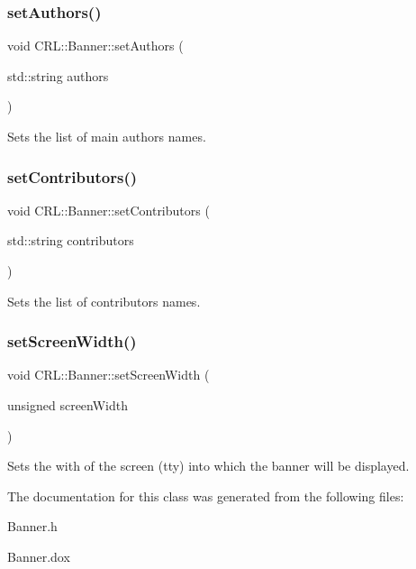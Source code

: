 \subsubsection{\texorpdfstring{set\+Authors()}{setAuthors()}}
{\footnotesize\ttfamily void C\+R\+L\+::\+Banner\+::set\+Authors (\begin{DoxyParamCaption}\item[{std\+::string}]{authors }\end{DoxyParamCaption})}

Sets the list of main author\textquotesingle{}s names. \mbox{\label{classCRL_1_1Banner_afa9171420263314ee5b465c36ecc0b73}} 
\subsubsection{\texorpdfstring{set\+Contributors()}{setContributors()}}
{\footnotesize\ttfamily void C\+R\+L\+::\+Banner\+::set\+Contributors (\begin{DoxyParamCaption}\item[{std\+::string}]{contributors }\end{DoxyParamCaption})}

Sets the list of contributor\textquotesingle{}s names. \mbox{\label{classCRL_1_1Banner_a8053cc6071f261e781cc1e8157eef820}} 
\subsubsection{\texorpdfstring{set\+Screen\+Width()}{setScreenWidth()}}
{\footnotesize\ttfamily void C\+R\+L\+::\+Banner\+::set\+Screen\+Width (\begin{DoxyParamCaption}\item[{unsigned}]{screen\+Width }\end{DoxyParamCaption})}

Sets the with of the screen (tty) into which the banner will be displayed. 

The documentation for this class was generated from the following files\+:\begin{DoxyCompactItemize}
\item 
Banner.\+h\item 
Banner.\+dox\end{DoxyCompactItemize}
